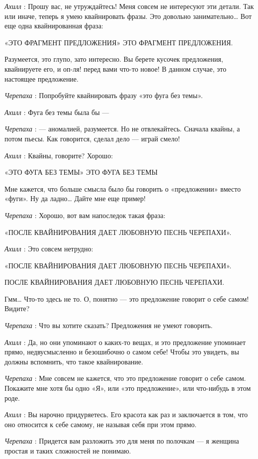 \emph{Ахилл} : Прошу вас, не утруждайтесь! Меня совсем не интересуют эти детали. Так или иначе, теперь я умею квайнировать фразы. Это довольно занимательно\ldots{} Вот еще одна квайнированная фраза:

«ЭТО ФРАГМЕНТ ПРЕДЛОЖЕНИЯ» ЭТО ФРАГМЕНТ ПРЕДЛОЖЕНИЯ.

Разумеется, это глупо, зато интересно. Вы берете кусочек предложения, квайнируете его, и оп-ля! перед вами что-то новое! В данном случае, это настоящее предложение.

\emph{Черепаха} : Попробуйте квайнировать фразу «это фуга без темы».

\emph{Ахилл} : Фуга без темы была бы ---

\emph{Черепаха} : --- аномалией, разумеется. Но не отвлекайтесь. Сначала квайны, а потом пьесы. Как говорится, сделал дело --- играй смело!

\emph{Ахилл} : Квайны, говорите? Хорошо:

«ЭТО ФУГА БЕЗ ТЕМЫ» ЭТО ФУГА БЕЗ ТЕМЫ

Мне кажется, что больше смысла было бы говорить о «предложении» вместо «фуги». Ну да ладно\ldots{} Дайте мне еще пример!

\emph{Черепаха} : Хорошо, вот вам напоследок такая фраза:

«ПОСЛЕ КВАЙНИРОВАНИЯ ДАЕТ ЛЮБОВНУЮ ПЕСНЬ ЧЕРЕПАХИ».

\emph{Ахилл} : Это совсем нетрудно:

«ПОСЛЕ КВАЙНИРОВАНИЯ ДАЕТ ЛЮБОВНУЮ ПЕСНЬ ЧЕРЕПАХИ».

ПОСЛЕ КВАЙНИРОВАНИЯ ДАЕТ ЛЮБОВНУЮ ПЕСНЬ ЧЕРЕПАХИ.

Гмм\ldots{} Что-то здесь не то. О, понятно --- это предложение говорит о себе самом! Видите?

\emph{Черепаха} : Что вы хотите сказать? Предложения не умеют говорить.

\emph{Ахилл} : Да, но они упоминают о каких-то вещах, и это предложение упоминает прямо, недвусмысленно и безошибочно о самом себе! Чтобы это увидеть, вы должны вспомнить, что такое квайнирование.

\emph{Черепаха} : Мне совсем не кажется, что это предложение говорит о себе самом. Покажите мне хотя бы одно «Я», или «это предложение», или что-нибудь в этом роде.

\emph{Ахилл} : Вы нарочно придуряетесь. Его красота как раз и заключается в том, что оно относится к себе самому, не называя себя при этом прямо.

\emph{Черепаха} : Придется вам разложить это для меня по полочкам --- я женщина простая и таких сложностей не понимаю.

